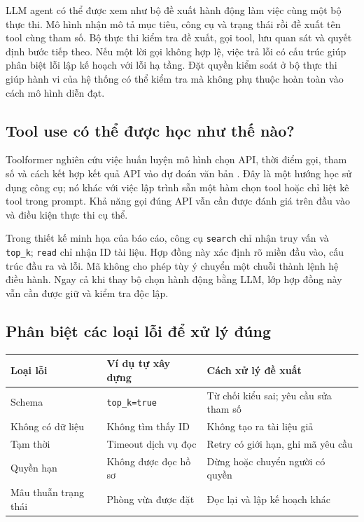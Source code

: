 LLM agent có thể được xem như bộ đề xuất hành động làm việc cùng một bộ thực thi.
Mô hình nhận mô tả mục tiêu, công cụ và trạng thái rồi đề xuất tên tool cùng tham số.
Bộ thực thi kiểm tra đề xuất, gọi tool, lưu quan sát và quyết định bước tiếp theo.
Nếu một lời gọi không hợp lệ, việc trả lỗi có cấu trúc giúp phân biệt lỗi lập kế
hoạch với lỗi hạ tầng. Đặt quyền kiểm soát ở bộ thực thi giúp hành vi của hệ thống
có thể kiểm tra mà không phụ thuộc hoàn toàn vào cách mô hình diễn đạt.

\subsection{Tool use có thể được học như thế nào?}
Toolformer nghiên cứu việc huấn luyện mô hình chọn API, thời điểm gọi, tham số và cách
kết hợp kết quả API vào dự đoán văn bản \cite{toolformer}. Đây là một hướng học sử
dụng công cụ; nó khác với việc lập trình sẵn một hàm chọn tool hoặc chỉ liệt kê tool
trong prompt. Khả năng gọi đúng API vẫn cần được đánh giá trên đầu vào và điều kiện
thực thi cụ thể.

Trong thiết kế minh họa của báo cáo, công cụ \texttt{search} chỉ nhận truy vấn và
\texttt{top\_k}; \texttt{read} chỉ nhận ID tài liệu. Hợp đồng này xác định rõ miền
đầu vào, cấu trúc đầu ra và lỗi. Mã không cho phép tùy ý chuyển một chuỗi thành lệnh
hệ điều hành. Ngay cả khi thay bộ chọn hành động bằng LLM, lớp hợp đồng này vẫn cần
được giữ và kiểm tra độc lập.

\subsection{Phân biệt các loại lỗi để xử lý đúng}
\begin{center}\small
\begin{tabularx}{\linewidth}{@{}p{3.0cm}XX@{}}\toprule
\textbf{Loại lỗi} & \textbf{Ví dụ tự xây dựng} & \textbf{Cách xử lý đề xuất}\\\midrule
Schema & \texttt{top\_k=true} & Từ chối kiểu sai; yêu cầu sửa tham số\\
Không có dữ liệu & Không tìm thấy ID & Không tạo ra tài liệu giả\\
Tạm thời & Timeout dịch vụ đọc & Retry có giới hạn, ghi mã yêu cầu\\
Quyền hạn & Không được đọc hồ sơ & Dừng hoặc chuyển người có quyền\\
Mâu thuẫn trạng thái & Phòng vừa được đặt & Đọc lại và lập kế hoạch khác\\\bottomrule
\end{tabularx}\end{center}

